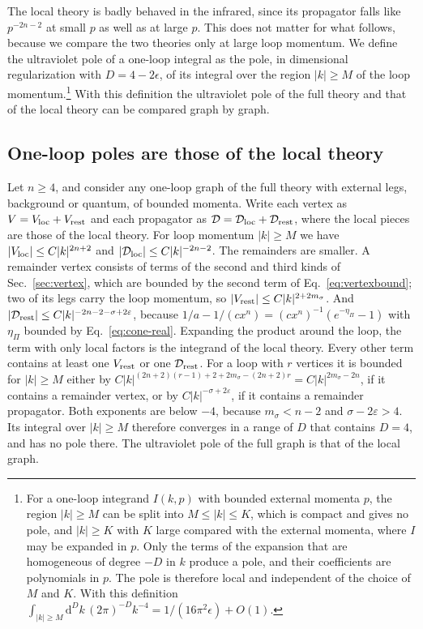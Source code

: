 \documentclass[aps,prd,10pt,twocolumn,superscriptaddress,nofootinbib,floatfix,longbibliography]{revtex4-2}
\newcommand{\dd}{\mathrm{d}}
\begin{document}
The local theory is badly behaved in the infrared, since its propagator falls like $p^{-2n-2}$ at small $p$ as well as at large $p$. This does not matter for what follows, because we compare the two theories only at large loop momentum. We define the ultraviolet pole of a one-loop integral as the pole, in dimensional regularization with $D=4-2\epsilon$, of its integral over the region $|k|\ge M$ of the loop momentum.\footnote{For a one-loop integrand $I(k,p)$ with bounded external momenta $p$, the region $|k|\ge M$ can be split into $M\le|k|\le K$, which is compact and gives no pole, and $|k|\ge K$ with $K$ large compared with the external momenta, where $I$ may be expanded in $p$. Only the terms of the expansion that are homogeneous of degree $-D$ in $k$ produce a pole, and their coefficients are polynomials in $p$. The pole is therefore local and independent of the choice of $M$ and $K$. With this definition $\int_{|k|\ge M}\dd^Dk\,(2\pi)^{-D}k^{-4}=1/(16\pi^2\epsilon)+O(1)$.} With this definition the ultraviolet pole of the full theory and that of the local theory can be compared graph by graph.

\subsection{One-loop poles are those of the local theory}
\label{sec:poles1}

Let $n\ge4$, and consider any one-loop graph of the full theory with external legs, background or quantum, of bounded momenta. Write each vertex as $V=V_{\rm loc}+V_{\rm rest}$ and each propagator as $\mathcal D=\mathcal D_{\rm loc}+\mathcal D_{\rm rest}$, where the local pieces are those of the local theory. For loop momentum $|k|\ge M$ we have $|V_{\rm loc}|\le C|k|^{2n+2}$ and $|\mathcal D_{\rm loc}|\le C|k|^{-2n-2}$. The remainders are smaller. A remainder vertex consists of terms of the second and third kinds of Sec.~\ref{sec:vertex}, which are bounded by the second term of Eq.~\eqref{eq:vertexbound}; two of its legs carry the loop momentum, so $|V_{\rm rest}|\le C|k|^{2+2m_\sigma}$. And $|\mathcal D_{\rm rest}|\le C|k|^{-2n-2-\sigma+2\varepsilon}$, because $1/a-1/(cx^n)=(cx^n)^{-1}(e^{-\eta_\Pi}-1)$ with $\eta_\Pi$ bounded by Eq.~\eqref{eq:cone-real}. Expanding the product around the loop, the term with only local factors is the integrand of the local theory. Every other term contains at least one $V_{\rm rest}$ or one $\mathcal D_{\rm rest}$. For a loop with $r$ vertices it is bounded for $|k|\ge M$ either by $C|k|^{(2n+2)(r-1)+2+2m_\sigma-(2n+2)r}=C|k|^{2m_\sigma-2n}$, if it contains a remainder vertex, or by $C|k|^{-\sigma+2\varepsilon}$, if it contains a remainder propagator. Both exponents are below $-4$, because $m_\sigma<n-2$ and $\sigma-2\varepsilon>4$. Its integral over $|k|\ge M$ therefore converges in a range of $D$ that contains $D=4$, and has no pole there. The ultraviolet pole of the full graph is that of the local graph.
\end{document}
